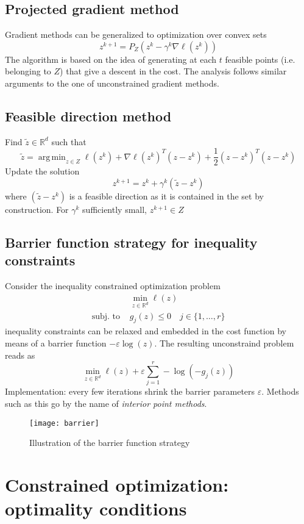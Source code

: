 \documentclass[openany]{book}
\DeclareMathOperator*{\argmin}{arg\,min}  %
\newcommand{\R}{\mathbb{R}}               %
\theoremstyle{definition}
\theoremstyle{remark}
\begin{document}
\subsection{Projected gradient method}

Gradient methods can be generalized to optimization over convex sets 
\[
    z^{k+1}=P_Z(z^k-\gamma^k\nabla\ell(z^k))
\]
The algorithm is based on the idea of generating at each $t$ feasible points (i.e. belonging to $Z$) that give a descent in the cost. The analysis follows similar arguments to the one of unconstrained gradient methods.

\subsection{Feasible direction method}

Find $\tilde{z}\in\R^d$ such that 
\[
    \tilde{z} = \argmin_{z\in Z} \ell(z^k)+\nabla\ell(z^k)^T(z-z^k)+\displaystyle\frac{1}{2}(z-z^k)^T(z-z^k)
\]
Update the solution 
\[
    z^{k+1}=z^k+\gamma^k(\tilde{z}-z^k)
\]
where $(\tilde{z}-z^k)$ is a feasible direction as it is contained in the set by construction. For $\gamma^k$ sufficiently small, $z^{k+1}\in Z$

\subsection{Barrier function strategy for inequality constraints}

Consider the inequality constrained optimization problem 
\begin{align*}
    &\min_{z\in\R^d}\ell(z)\\
    \text{subj. to } &g_j(z)\leq 0 \quad j\in \{1,\dots,r\}
\end{align*}  
inequality constraints can be relaxed and embedded in the cost function by means of a barrier function $-\varepsilon \log(z)$. The resulting unconstraind problem reads as 
\[
    \min_{z\in\R^d} \ell(z) + \varepsilon \displaystyle\sum_{j=1}^{r}-\log(-g_j(z))
\]
Implementation: every few iterations shrink the barrier parameters $\varepsilon$.
Methods such as this go by the name of \emph{interior point methods}.
\begin{figure}[ht]
    \centering
    \texttt{[image: barrier]}
    \caption{Illustration of the barrier function strategy}
\end{figure}

\section{Constrained optimization: optimality conditions}
\end{document}
